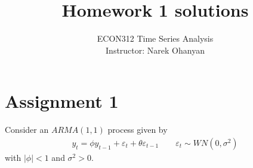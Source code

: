 \documentclass[12pt]{article}
\title{\textbf{Homework 1 solutions}}
\author{ECON312 Time Series Analysis \\ Instructor: Narek Ohanyan}
\date{}
\begin{document}
\maketitle


\section*{Assignment 1}

Consider an $ ARMA(1, 1) $ process given by
\begin{align*}
    y_{t} = \phi y_{t-1} + \varepsilon_{t} + \theta \varepsilon_{t-1} \qquad \varepsilon_{t} \sim WN(0, \sigma^2)
\end{align*}
with $ | \phi | < 1 $ and $ \sigma^2 > 0 $.
\end{document}
